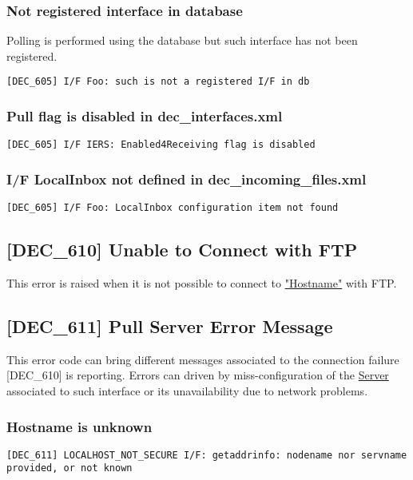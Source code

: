 \documentclass[dec_sum_main.tex]{subfiles}
\begin{document}
\subsubsection{Not registered interface in database }
Polling is performed using the database but such interface has not been registered.
\begin{verbatim}
[DEC_605] I/F Foo: such is not a registered I/F in db
\end{verbatim}

\subsubsection{Pull flag is disabled in  dec\_interfaces.xml }
\begin{verbatim}
[DEC_605] I/F IERS: Enabled4Receiving flag is disabled
\end{verbatim}

\subsubsection{I/F LocalInbox not defined in  dec\_incoming\_files.xml }
\begin{verbatim}
[DEC_605] I/F Foo: LocalInbox configuration item not found
\end{verbatim}

\label{DEC610}
\subsection{[DEC\_610] Unable to Connect with FTP}
This error is raised when it is not possible to connect to \hyperref[Config_Server]{"Hostname"} with FTP.

\subsection{[DEC\_611] Pull Server Error Message}
\label{DEC611}
This error code can bring different messages associated to the connection failure [DEC\_610] is reporting. Errors can driven by miss-configuration of the \hyperref[Config_Server]{Server} associated to such interface or its unavailability due to network problems.

\subsubsection{Hostname is unknown}
\begin{verbatim}
[DEC_611] LOCALHOST_NOT_SECURE I/F: getaddrinfo: nodename nor servname provided, or not known
\end{verbatim}
\end{document}
